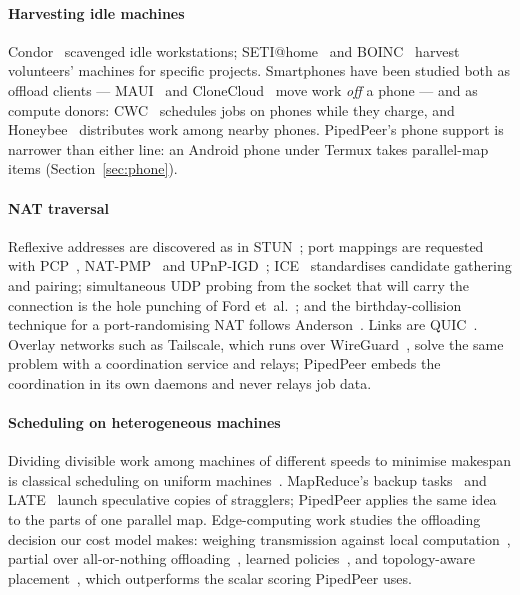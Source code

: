 \documentclass[5p,times,twocolumn]{elsarticle}
\begin{document}
\paragraph{Harvesting idle machines} Condor~\cite{litzkow1988condor} scavenged
idle workstations; SETI@home~\cite{anderson2002seti} and
BOINC~\cite{anderson2004boinc} harvest volunteers' machines for specific
projects. Smartphones have been studied both as offload clients ---
MAUI~\cite{cuervo2010maui} and CloneCloud~\cite{chun2011clonecloud} move work
\emph{off} a phone --- and as compute donors: CWC~\cite{arslan2012cwc} schedules
jobs on phones while they charge, and Honeybee~\cite{fernando2012honeybee}
distributes work among nearby phones. PipedPeer's phone support is narrower
than either line: an Android phone under Termux takes parallel-map items
(Section~\ref{sec:phone}).

\paragraph{NAT traversal} Reflexive addresses are discovered as in
STUN~\cite{rfc8489}; port mappings are requested with PCP~\cite{rfc6887},
NAT-PMP~\cite{rfc6886} and UPnP-IGD~\cite{upnpigd}; ICE~\cite{rfc8445}
standardises candidate gathering and pairing; simultaneous UDP probing from the
socket that will carry the connection is the hole punching of Ford
et~al.~\cite{ford2005p2p}; and the birthday-collision technique for a
port-randomising NAT follows Anderson~\cite{anderson2020nat}. Links are
QUIC~\cite{rfc9000}. Overlay networks such as Tailscale, which runs over
WireGuard~\cite{donenfeld2017wireguard}, solve the same problem with a
coordination service and relays; PipedPeer embeds the coordination in its own
daemons and never relays job data.

\paragraph{Scheduling on heterogeneous machines} Dividing divisible work among
machines of different speeds to minimise makespan is classical scheduling on
uniform machines~\cite{graham1969bounds,hochbaum1988uniform}. MapReduce's
backup tasks~\cite{dean2004mapreduce} and LATE~\cite{zaharia2008late} launch
speculative copies of stragglers; PipedPeer applies the same idea to the parts
of one parallel map. Edge-computing work studies the offloading decision our
cost model makes: weighing transmission against local
computation~\cite{deng2023}, partial over all-or-nothing
offloading~\cite{yong2023}, learned policies~\cite{he2024}, and
topology-aware placement~\cite{zhao2023}, which outperforms the scalar scoring
PipedPeer uses.
\end{document}
